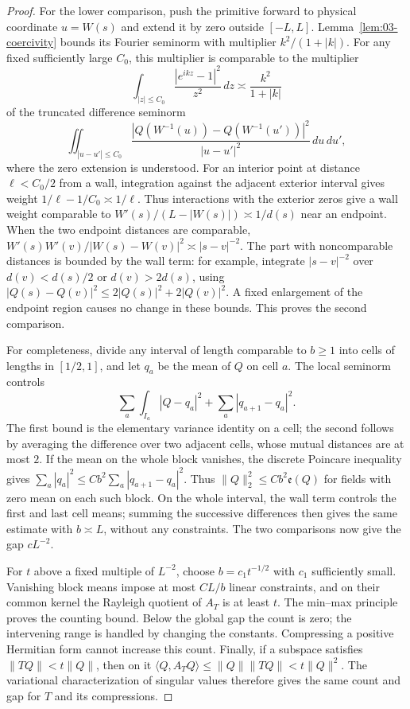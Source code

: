 \begin{proof}
For the lower comparison, push the primitive forward to physical
coordinate \(u=W(s)\) and extend it by zero outside \([-L,L]\).
Lemma~\ref{lem:03-coercivity} bounds its Fourier seminorm with multiplier
\(k^2/(1+|k|)\). For any fixed sufficiently large \(C_0\), this multiplier
is comparable to the multiplier
\[
 \int_{|z|\le C_0}\frac{|e^{ikz}-1|^2}{z^2}\,dz
 \asymp\frac{k^2}{1+|k|}
\]
of the truncated difference seminorm
\[
 \iint_{|u-u'|\le C_0}
 \frac{|Q(W^{-1}(u))-Q(W^{-1}(u'))|^2}{|u-u'|^2}\,du\,du',
\]
where the zero extension is understood. For an interior point at distance \(\ell<C_0/2\) from a wall,
integration against the adjacent exterior interval gives weight
\(1/\ell-1/C_0\asymp1/\ell\). Thus interactions with the exterior
zeros give a wall weight comparable to
\(W'(s)/(L-|W(s)|)\asymp1/d(s)\) near an endpoint.
When the two endpoint distances are comparable,
\(W'(s)W'(v)/|W(s)-W(v)|^2\asymp|s-v|^{-2}\).
The part with noncomparable distances is bounded by the wall term:
for example, integrate \(|s-v|^{-2}\) over \(d(v)<d(s)/2\) or
\(d(v)>2d(s)\), using \(|Q(s)-Q(v)|^2\le2|Q(s)|^2+2|Q(v)|^2\).
A fixed enlargement of the endpoint region causes no change in these
bounds. This proves the second comparison.

For completeness, divide any interval of length comparable to
\(b\ge1\) into cells of lengths in \([1/2,1]\), and let \(q_a\)
be the mean of \(Q\) on cell \(a\). The local seminorm controls
\[
 \sum_a\int_{I_a}|Q-q_a|^2
       +\sum_a|q_{a+1}-q_a|^2.
\]
The first bound is the elementary variance identity on a cell; the
second follows by averaging the difference over two adjacent cells,
whose mutual distances are at most \(2\). If the mean on the whole
block vanishes, the discrete Poincare inequality gives
\(\sum_a|q_a|^2\le Cb^2\sum_a|q_{a+1}-q_a|^2\).
Thus \(\|Q\|_2^2\le Cb^2\mathfrak e(Q)\) for fields with zero
mean on each such block. On the whole interval, the wall term controls
the first and last cell means; summing the successive differences then
gives the same estimate with \(b\asymp L\), without any constraints.
The two comparisons now give the gap \(cL^{-2}\).

For \(t\) above a fixed multiple of \(L^{-2}\), choose
\(b=c_1t^{-1/2}\) with \(c_1\) sufficiently small. Vanishing block
means impose at most \(CL/b\) linear constraints, and on their common
kernel the Rayleigh quotient of \(A_T\) is at least \(t\).
The min--max principle proves the counting bound. Below the global
gap the count is zero; the intervening range is handled by changing
the constants. Compressing a positive Hermitian form cannot increase
this count. Finally, if a subspace satisfies
\(\|TQ\|<t\|Q\|\), then on it
\(\langle Q,A_TQ\rangle\le\|Q\|\|TQ\|<t\|Q\|^2\).
The variational characterization of singular values therefore gives
the same count and gap for \(T\) and its compressions.
\end{proof}

